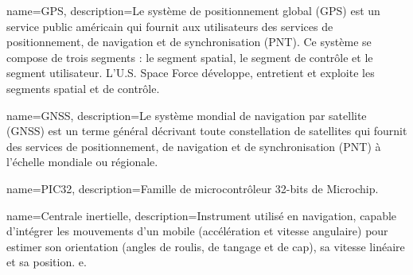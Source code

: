 
{
	name=GPS,
	description={Le système de positionnement global (GPS) est un service public américain qui fournit aux utilisateurs des services de positionnement, de navigation et de synchronisation (PNT). Ce système se compose de trois segments : le segment spatial, le segment de contrôle et le segment utilisateur. L'U.S. Space Force développe, entretient et exploite les segments spatial et de contrôle.}
}

{
	name=GNSS,
	description={Le système mondial de navigation par satellite (GNSS) est un terme général décrivant toute constellation de satellites qui fournit des services de positionnement, de navigation et de synchronisation (PNT) à l'échelle mondiale ou régionale.}
}

{
	name=PIC32,
	description={Famille de microcontrôleur 32-bits de Microchip.}
}

{
	name=Centrale inertielle,
	description={Instrument utilisé en navigation, capable d'intégrer les mouvements d'un mobile (accélération et vitesse angulaire) pour estimer son orientation (angles de roulis, de tangage et de cap), sa vitesse linéaire et sa position. e.}
}



